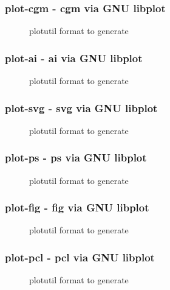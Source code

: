 \documentclass[english,a4paper]{article}
\begin{document}
\subsubsection{plot-cgm - cgm via GNU libplot}
\begin{description}
\item[]
plotutil format to generate


\end{description}
\subsubsection{plot-ai - ai via GNU libplot}
\begin{description}
\item[]
plotutil format to generate


\end{description}
\subsubsection{plot-svg - svg via GNU libplot}
\begin{description}
\item[]
plotutil format to generate


\end{description}
\subsubsection{plot-ps - ps via GNU libplot}
\begin{description}
\item[]
plotutil format to generate


\end{description}
\subsubsection{plot-fig - fig via GNU libplot}
\begin{description}
\item[]
plotutil format to generate


\end{description}
\subsubsection{plot-pcl - pcl via GNU libplot}
\begin{description}
\item[]
plotutil format to generate


\end{description}
\end{document}
